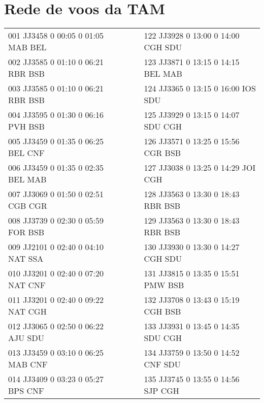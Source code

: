 \chapter{Rede de voos da TAM}\label{anx:nettam}


\begin{scriptsize}

\begin{longtable}{l c c l}

001 JJ3458 0 00:05 0 01:05 MAB BEL & & & 122 JJ3928 0 13:00 0 14:00 CGH SDU \\

002 JJ3585 0 01:10 0 06:21 RBR BSB & & & 123 JJ3871 0 13:15 0 14:15 BEL MAB \\

003 JJ3585 0 01:10 0 06:21 RBR BSB & & & 124 JJ3365 0 13:15 0 16:00 IOS SDU \\

004 JJ3595 0 01:30 0 06:16 PVH BSB & & & 125 JJ3929 0 13:15 0 14:07 SDU CGH \\

005 JJ3459 0 01:35 0 06:25 BEL CNF & & & 126 JJ3571 0 13:25 0 15:56 CGR BSB \\

006 JJ3459 0 01:35 0 02:35 BEL MAB & & & 127 JJ3038 0 13:25 0 14:29 JOI CGH \\

007 JJ3069 0 01:50 0 02:51 CGB CGR & & & 128 JJ3563 0 13:30 0 18:43 RBR BSB \\

008 JJ3739 0 02:30 0 05:59 FOR BSB & & & 129 JJ3563 0 13:30 0 18:43 RBR BSB \\

009 JJ2101 0 02:40 0 04:10 NAT SSA & & & 130 JJ3930 0 13:30 0 14:27 CGH SDU \\

010 JJ3201 0 02:40 0 07:20 NAT CNF & & & 131 JJ3815 0 13:35 0 15:51 PMW BSB \\

011 JJ3201 0 02:40 0 09:22 NAT CGH & & & 132 JJ3708 0 13:43 0 15:19 CGH BSB \\

012 JJ3065 0 02:50 0 06:22 AJU SDU & & & 133 JJ3931 0 13:45 0 14:35 SDU CGH \\

013 JJ3459 0 03:10 0 06:25 MAB CNF & & & 134 JJ3759 0 13:50 0 14:52 CNF SDU \\

014 JJ3409 0 03:23 0 05:27 BPS CNF & & & 135 JJ3745 0 13:55 0 14:56 SJP CGH \\


\end{longtable}
\end{scriptsize}
